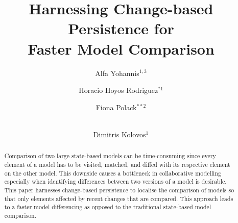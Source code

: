 \documentclass{llncs}
\begin{document}
\renewcommand{\thelstlisting}{\arabic{lstlisting}}
\renewcommand{\labelitemi}{$\bullet$}
\newcommand{\dk}[1]{\textbf{[DK: #1]}}

\title{Harnessing Change-based Persistence for\\Faster Model Comparison}
%
%
\author{
Alfa Yohannis$^{1,3}$ \and Horacio Hoyos Rodriguez$^{*1}$ \and Fiona Polack$^{**2}$ \and \\ Dimitris Kolovos$^{1}$
}
%
%



\maketitle      %

\begin{abstract}
Comparison of two large state-based models can be time-consuming since every element of a model has to be visited, matched, and diffed with its respective element on the other model. This downside causes a bottleneck in collaborative modelling especially when identifying differences between two versions of a model is desirable. This paper harnesses change-based persistence to localise the comparison of models so that only elements affected by recent changes that are compared. This approach leads to a faster model differencing as opposed to the traditional state-based model comparison. 
\end{abstract}
\end{document}
